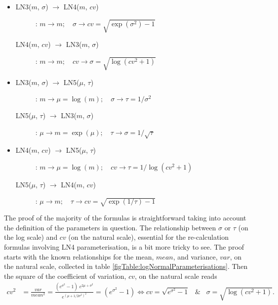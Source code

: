 {\begin{itemize}
\begin{description}
\item[LN5($\mu$, $\tau$) $\rightarrow$ LN2($\mu$, $v$)]:
$\mu \rightarrow \mu; \quad \tau \rightarrow v=1/\tau$
\end{description}

\item 
\begin{description}
\item[LN3($m$, $\sigma$) $\rightarrow$ LN4($m$, $cv$)]:
$m \rightarrow m; \quad \sigma \rightarrow cv=\sqrt{\exp(\sigma^2)-1}$

\item[LN4($m$, $cv$) $\rightarrow$ LN3($m$, $\sigma$)]:
$m \rightarrow m; \quad cv \rightarrow \sigma=\sqrt{\log(cv^2 + 1)}$
\end{description}

\item 
\begin{description}
\item[LN3($m$, $\sigma$) $\rightarrow$ LN5($\mu$, $\tau$)]:
$m \rightarrow \mu=\log(m); \quad \sigma \rightarrow \tau=1/\sigma^2$

\item[LN5($\mu$, $\tau$) $\rightarrow$ LN3($m$, $\sigma$)]:
$\mu \rightarrow m=\exp(\mu); \quad \tau \rightarrow \sigma=1/\sqrt{\tau}$
\end{description}

\item 
\begin{description}
\item[LN4($m$, $cv$) $\rightarrow$ LN5($\mu$, $\tau$)]:
$m \rightarrow \mu=\log(m); \quad cv \rightarrow \tau=1/\log(cv^2+1)$

\item[LN5($\mu$, $\tau$) $\rightarrow$ LN4($m$, $cv$)]:
$\mu \rightarrow m; \quad \tau \rightarrow cv=\sqrt{\exp(1/\tau)-1}$
\end{description}
\end{itemize}

The proof of the majority of the formulas is straightforward taking into account the definition
of the parameters in question. The relationship between $\sigma$ or $\tau$ (on the log scale) 
and $cv$ (on the natural scale), essential for the re-calculation formulas involving
LN4 parameterisation, is a bit more tricky to see. The 
proof starts with the known relationships for the mean, $mean$, and variance, $var$, on the natural 
scale, collected in table \ref{figTable:logNormalParameterisations}. 
Then the square of the coefficient of variation, $cv$, on the natural scale reads
\begin{align}
	cv^2 &= \frac{var}{mean^2} = \frac{(e^{\sigma^2}-1)\; e^{2\mu + \sigma^2}}{e^{(\mu + 1/2\sigma^2)^2}}
	= (e^{\sigma^2}-1) \Leftrightarrow cv = \sqrt{e^{\sigma^2}-1} \;\;\; \& \;\;\; \sigma=\sqrt{\log(cv^2 + 1)}. \nonumber
\end{align}

}
